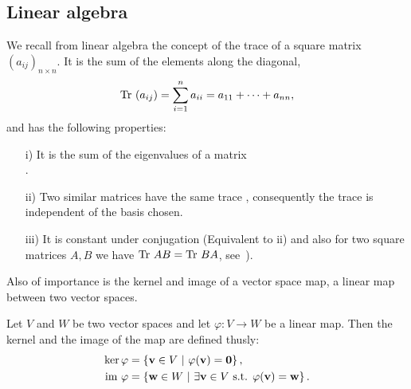 \subsection{Linear algebra}

	
		We recall from linear algebra the concept of the trace of a square matrix $(a_{ij})_{n \times n}$. It is the sum of the elements along the diagonal,
		\begin{align*}
			\text{Tr }(a_{ij})= \sum_{i=1}^{n} a_{ii} = a_{11} + \dots + a_{nn},
		\end{align*}
		and has the following properties:
		\begin{proposition}\label{prop:trace}
			\begin{itemize}
				\item[i)] It is the sum of the eigenvalues of a matrix  \\ \cite[Cor.8.6.1.]{Nicholson}.
				\item[ii)] Two similar matrices have the same trace \cite[Thm.5.5.1.]{Nicholson}, consequently the trace is independent of the basis chosen.
				\item[iii)] It is constant under conjugation (Equivalent to ii) and also for two square matrices $A,B$ we have $\text{Tr } AB = \text{Tr } BA$, see~\cite[Ex.2.3.30.]{Nicholson}).
			\end{itemize}
		\end{proposition}


	Also of importance is the kernel and image of a vector space map, a linear map between two vector spaces. %
		
	\begin{definition}\label{def:kernelimage}
		Let $V$ and $W$ be two vector spaces and let $\varphi: V \rightarrow W$ be a linear map. Then the kernel and the image of the map are defined thusly:
		\begin{align*}
			 \ker \varphi &= \left\lbrace \mathbf{v} \in V \ \middle\vert \ \varphi(\mathbf{v}) = \mathbf{0} \right\rbrace, \\  \text{im } \varphi &= \left\lbrace \mathbf{w} \in W \ \middle\vert \ \exists \mathbf{v} \in V \text{ s.t. } \varphi(\mathbf{v}) = \mathbf{w} \right\rbrace.
		\end{align*}
	\end{definition}
	
